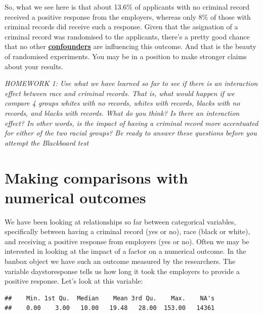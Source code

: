 \documentclass[]{book}
\newenvironment{Shaded}{\begin{snugshade}}{\end{snugshade}}
\newcommand{\KeywordTok}[1]{\textcolor[rgb]{0.13,0.29,0.53}{\textbf{#1}}}
\newcommand{\NormalTok}[1]{#1}
\newcommand{\OperatorTok}[1]{\textcolor[rgb]{0.81,0.36,0.00}{\textbf{#1}}}
\theoremstyle{definition}
\theoremstyle{definition}
\theoremstyle{definition}
\theoremstyle{remark}
\begin{document}
So, what we see here is that about 13.6\% of applicants with no criminal
record received a positive response from the employers, whereas only 8\%
of those with criminal records did receive such a response. Given that
the asignation of a criminal record was randomised to the applicants,
there's a pretty good chance that no other
\href{https://en.wikipedia.org/wiki/Confounding}{\textbf{confounders}}
are influencing this outcome. And that is the beauty of randomised
experiments. You may be in a position to make stronger claims about your
results.

\emph{HOMEWORK 1:} \emph{Use what we have learned so far to see if there
is an interaction effect between race and criminal records. That is,
what would happen if we compare 4 groups whites with no records, whites
with records, blacks with no records, and blacks with records. What do
you think? Is there an interaction effect? In other words, is the impact
of having a criminal record more accentuated for either of the two
racial groups? Be ready to answer these questions before you attempt the
Blackboard test}

\hypertarget{making-comparisons-with-numerical-outcomes}{%
\section{Making comparisons with numerical
outcomes}\label{making-comparisons-with-numerical-outcomes}}

We have been looking at relationships so far between categorical
variables, specifically between having a criminal record (yes or no),
race (black or white), and receiving a positive response from employers
(yes or no). Often we may be interested in looking at the impact of a
factor on a numerical outcome. In the banbox object we have such an
outcome measured by the researchers. The variable daystoresponse tells
us how long it took the employers to provide a positive response. Let's
look at this variable:

\begin{Shaded}
\end{Shaded}

\begin{verbatim}
##    Min. 1st Qu.  Median    Mean 3rd Qu.    Max.    NA's 
##    0.00    3.00   10.00   19.48   28.00  153.00   14361
\end{verbatim}
\end{document}
